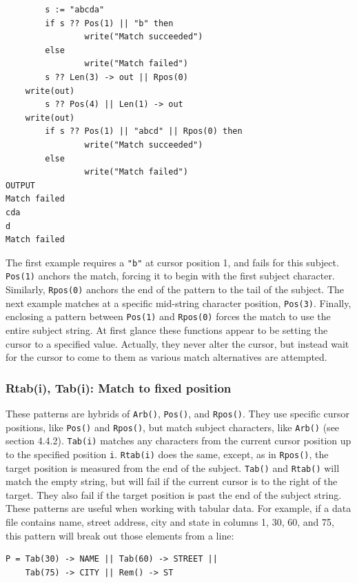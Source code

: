 \documentclass[letterpaper,12pt]{article}
\begin{document}
\begin{verbatim}
        s := "abcda"
        if s ?? Pos(1) || "b" then
                write("Match succeeded")
        else
                write("Match failed")
        s ?? Len(3) -> out || Rpos(0) 
	write(out)
        s ?? Pos(4) || Len(1) -> out
	write(out)
        if s ?? Pos(1) || "abcd" || Rpos(0) then
                write("Match succeeded")
        else
                write("Match failed")
OUTPUT
Match failed
cda
d
Match failed
\end{verbatim}

The first example requires a {\tt "b"} at cursor position 1, and fails for
this subject. {\tt Pos(1)} anchors the match, forcing it to begin with the
first subject character. Similarly, {\tt Rpos(0)} anchors the end of the
pattern to the tail of the subject. The next example matches at a
specific mid-string character position, {\tt Pos(3)}. Finally, enclosing a
pattern between {\tt Pos(1)} and {\tt Rpos(0)} forces the match to use the
entire subject string.  At first glance these functions appear to be
setting the cursor to a specified value. Actually, they never alter
the cursor, but instead wait for the cursor to come to them as various
match alternatives are attempted.

\subsubsection{Rtab(i), Tab(i): Match to fixed position}

These patterns are hybrids of {\tt Arb()}, {\tt Pos()}, and {\tt Rpos()}.
They use specific cursor positions, like {\tt Pos()} and {\tt Rpos()},
but match subject characters, like {\tt Arb()} (see section 4.4.2).
{\tt Tab(i)} matches any characters from the
current cursor position up to the specified position {\tt i}. {\tt Rtab(i)}
does the same, except, as in {\tt Rpos()}, the target position is measured
from the end of the subject.  {\tt Tab()} and {\tt Rtab()} will match the
empty string, but
will fail if the current cursor is to the right of the target. They
also fail if the target position is past the end of the subject
string.  These patterns are useful when working with tabular data. For
example, if a data file contains name, street address, city and state
in columns 1, 30, 60, and 75, this pattern will break out those
elements from a line:

\begin{verbatim}
P = Tab(30) -> NAME || Tab(60) -> STREET || 
	Tab(75) -> CITY || Rem() -> ST
\end{verbatim}
\end{document}
